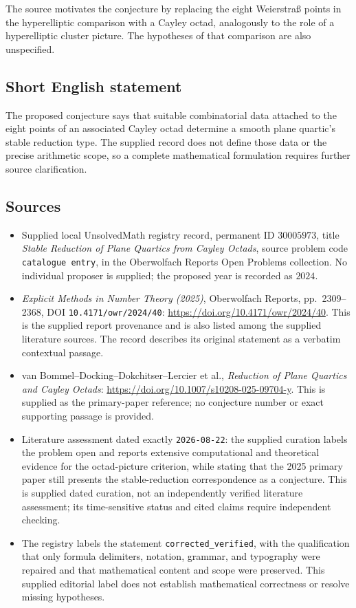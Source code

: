 \documentclass[11pt]{article}
\begin{document}
The source motivates the conjecture by replacing the eight Weierstra\ss{} points in the hyperelliptic comparison with a Cayley octad, analogously to the role of a hyperelliptic cluster picture. The hypotheses of that comparison are also unspecified.
\subsection{Short English statement}
The proposed conjecture says that suitable combinatorial data attached to the eight points of an associated Cayley octad determine a smooth plane quartic's stable reduction type. The supplied record does not define those data or the precise arithmetic scope, so a complete mathematical formulation requires further source clarification.
\subsection{Sources}
\begin{itemize}
\item Supplied local UnsolvedMath registry record, permanent ID \(30005973\), title \emph{Stable Reduction of Plane Quartics from Cayley Octads}, source problem code \texttt{catalogue entry}, in the Oberwolfach Reports Open Problems collection. No individual proposer is supplied; the proposed year is recorded as \(2024\).
\item \emph{Explicit Methods in Number Theory (2025)}, Oberwolfach Reports, pp.\ 2309--2368, DOI \texttt{10.4171/owr/2024/40}: \url{https://doi.org/10.4171/owr/2024/40}. This is the supplied report provenance and is also listed among the supplied literature sources. The record describes its original statement as a verbatim contextual passage.
\item van Bommel--Docking--Dokchitser--Lercier et al., \emph{Reduction of Plane Quartics and Cayley Octads}: \url{https://doi.org/10.1007/s10208-025-09704-y}. This is supplied as the primary-paper reference; no conjecture number or exact supporting passage is provided.
\item Literature assessment dated exactly \texttt{2026-08-22}: the supplied curation labels the problem open and reports extensive computational and theoretical evidence for the octad-picture criterion, while stating that the 2025 primary paper still presents the stable-reduction correspondence as a conjecture. This is supplied dated curation, not an independently verified literature assessment; its time-sensitive status and cited claims require independent checking.
\item The registry labels the statement \texttt{corrected\_verified}, with the qualification that only formula delimiters, notation, grammar, and typography were repaired and that mathematical content and scope were preserved. This supplied editorial label does not establish mathematical correctness or resolve missing hypotheses.
\end{itemize}
\end{document}
